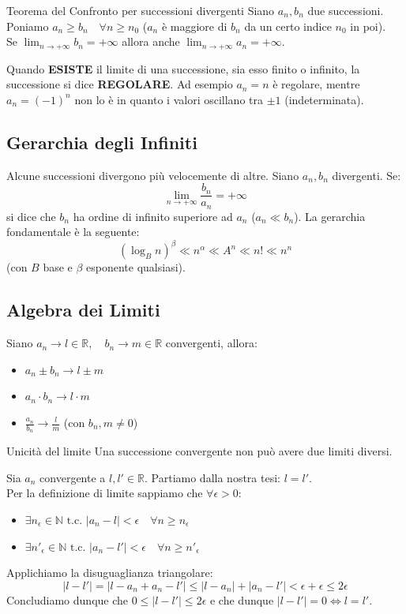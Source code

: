 \documentclass[12pt]{report}
\newcommand{\N}{\mathbb{N}}
\newcommand{\R}{\mathbb{R}}
\begin{document}
	\begin{teorema}{Teorema del Confronto per successioni divergenti}{}
		Siano $a_n, b_n$ due successioni. Poniamo $a_n \ge b_n \quad \forall n \ge n_0$ ($a_n$ è maggiore di $b_n$ da un certo indice $n_0$ in poi).\\
		Se $\lim_{n \to +\infty} b_n = +\infty$ allora anche $\lim_{n \to +\infty} a_n = +\infty$.
	\end{teorema}
	
	\begin{osservazione}{}{}
		Quando \textbf{ESISTE} il limite di una successione, sia esso finito o infinito, la successione si dice \textbf{REGOLARE}. Ad esempio $a_n = n$ è regolare, mentre $a_n = (-1)^n$ non lo è in quanto i valori oscillano tra $\pm 1$ (indeterminata).
	\end{osservazione}
	
	\subsection{Gerarchia degli Infiniti}
	Alcune successioni divergono più velocemente di altre. Siano $a_n, b_n$ divergenti. Se:
	\[
	\lim_{n \to +\infty} \frac{b_n}{a_n} = +\infty
	\]
	si dice che $b_n$ ha ordine di infinito superiore ad $a_n$ ($a_n \ll b_n$).
	La gerarchia fondamentale è la seguente:
	\[
	(\log_B n)^\beta \ll n^\alpha \ll A^n \ll n! \ll n^n
	\]
	(con $B$ base e $\beta$ esponente qualsiasi).
	
	\subsection{Algebra dei Limiti}
	Siano $a_n \to l \in \R, \quad b_n \to m \in \R$ convergenti, allora:
	\begin{itemize}
		\item $a_n \pm b_n \to l \pm m$
		\item $a_n \cdot b_n \to l \cdot m$
		\item $\frac{a_n}{b_n} \to \frac{l}{m}$ (con $b_n, m \neq 0$)
	\end{itemize}
	
	\begin{teorema}{Unicità del limite}{}
		Una successione convergente non può avere due limiti diversi.
	\end{teorema}
	\begin{dimostrazione}{}{}
		Sia $a_n$ convergente a $l, l' \in \R$. Partiamo dalla nostra tesi: $l = l'$.\\
		Per la definizione di limite sappiamo che $\forall \epsilon > 0$:
		\begin{itemize}
			\item $\exists n_\epsilon \in \N \text{ t.c. } |a_n - l| < \epsilon \quad \forall n \ge n_\epsilon$
			\item $\exists n'_\epsilon \in \N \text{ t.c. } |a_n - l'| < \epsilon \quad \forall n \ge n'_\epsilon$
		\end{itemize}
		Applichiamo la disuguaglianza triangolare:
		\[
		|l - l'| = |l - a_n + a_n - l'| \le |l - a_n| + |a_n - l'| < \epsilon + \epsilon \le 2\epsilon
		\]
		Concludiamo dunque che $0 \le |l - l'| \le 2\epsilon$ e che dunque $|l - l'| = 0 \iff l = l'$.
	\end{dimostrazione}
	
\end{document}
